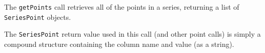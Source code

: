 The \verb+getPoints+ call retrieves all of the points in a series, returning a list of
\verb+SeriesPoint+ objects.

The \verb+SeriesPoint+ return value used in this call (and other point calls) is simply a compound
structure containing the column name and value (as a string).
